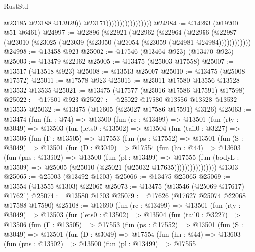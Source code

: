 \begin{lexlean}{RustStd}
\begin{coremodule}
                                          @23185
                                          @23188
                                          @13929))
                                      @23171)))))))))))))))))
@24984 := @14263 (@19200 @51 @6461)
@24997 := @22896
    (@22921
      (@22962
        (@22964
          (@22966 (@22987 (@23010 (@23025 (@23039 (@23050 (@23054 (@23059 (@24981 @24984))))))))))))
@24998 := @13458 @923
@25002 := @17546 (@13464 @923) (@13470 @923)
@25003 := @13479 @22062
@25005 := @13475 (@25003 @17558)
@25007 := @13517 (@13518 @923)
@25008 := @13513 @25007
@25010 := @13475 (@25008 @17572)
@25011 := @17578 @923
@25016 := @25011 @17580 @13556 @13528 @13532 @13535
@25021 := @13475 (@17577 (@25016 @17586 @17591) @17598)
@25022 := @17601 @923
@25027 := @25022 @17580 @13556 @13528 @13532 @13535
@25032 := @13475 (@13605 (@25027 @17586 @17591) @3126)
@25063 := @13474
    (fun (fn : @74) =>
    @13500
      (fun (rc : @13499) =>
      @13501
        (fun (rty : @3049) =>
        @13503
          (fun (lets0 : @13502) =>
          @13504
            (fun (tail0 : @3227) =>
            @13506
              (fun (Γ : @13505) =>
              @17553
                (fun (ps : @17552) =>
                @13501
                  (fun (S : @3049) =>
                  @13501
                    (fun (D : @3049) =>
                    @17554
                      (fun (hn : @44) =>
                      @13603
                        (fun (pns : @13602) =>
                        @13500
                          (fun (pl : @13499) =>
                          @17555
                            (fun (bodyL : @13509) =>
                            @25005 (@25010 (@25021 (@25032 @17635))))))))))))))))
    @1303
@25065 := @25003 (@13492 @1303)
@25066 := @13475 @25065
@25069 := @13554 (@13555 @1303) @22065
@25073 := @13475 (@13546 (@25069 @17617) @17621)
@25074 := @13580 @1303
@25079 := @17626 (@17627 @25074 @22068 @17588 @17590)
@25108 := @13690
    (fun (rc : @13499) =>
    @13501
      (fun (rty : @3049) =>
      @13503
        (fun (lets0 : @13502) =>
        @13504
          (fun (tail0 : @3227) =>
          @13506
            (fun (Γ : @13505) =>
            @17553
              (fun (ps : @17552) =>
              @13501
                (fun (S : @3049) =>
                @13501
                  (fun (D : @3049) =>
                  @17554
                    (fun (hn : @44) =>
                    @13603
                      (fun (pns : @13602) =>
                      @13500
                        (fun (pl : @13499) =>
                        @17555

\end{coremodule}
\end{lexlean}
